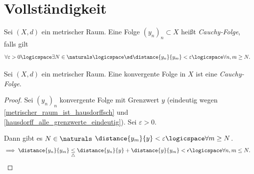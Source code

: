 \section*{Vollständigkeit}
\begin{definition}
    Sei \( (X,d) \) ein metrischer Raum. Eine Folge \( (y_n)_n \subset X\) heißt \emph{Cauchy-Folge}, falls gilt
    \begin{align*}
        \forall \varepsilon>0 \logicspace \exists N\in \naturals \logicspace\text{\sd} \distance{y_n}{ y_m}<\varepsilon \logicspace \forall n,m\geq N.
    \end{align*} 
\end{definition}
\begin{lemma}
    Sei \( (X,d) \)  ein metrischer Raum. Eine konvergente Folge in \( X \)  ist eine \emph{Cauchy-Folge}.
\end{lemma}
\begin{proof}
    Sei \( (y_n)_n \)  konvergente Folge mit Grenzwert \( y \) (eindeutig wegen \ref{metrischer_raum_ist_hausdorffsch} und \ref{hausdorff_alle_grenzwerte_eindeutig}). Sei \( \varepsilon>0 \).

    Dann gibt es \( N\in \naturals  \) \sd \( \distance{y_m}{ y}<\varepsilon \logicspace  \forall m\geq N\).
    \begin{align*}
        \implies \distance{y_n}{y_m}\underset{\triangle}{\leq}\distance{y_n}{y}+\distance{y}{y_m}<\epsilon \logicspace \forall n,m\leq N.
    \end{align*}   
\end{proof}
